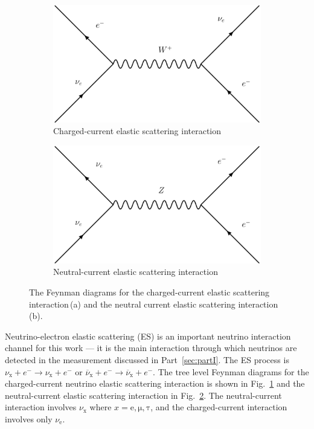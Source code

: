\label{sec:esxsec}
\begin{figure}
\centering
\begin{subfigure}[t]{0.48\textwidth}
\centering
    \includegraphics[width=\textwidth]{cc_es}
    \caption[Charged Current Elastic Scattering Feynman Diagram]{
Charged-current elastic scattering interaction}
\label{fig:ES_CC}
\end{subfigure}
\hfill
\begin{subfigure}[t]{0.48\textwidth}
\centering
    \includegraphics[width=\textwidth]{nc_es}
\caption[Neutral Current Elastic Scattering Feynman Diagram]{
Neutral-current elastic scattering interaction}
\label{fig:ES_NC}
\end{subfigure}
\label{fig:feynman_es}
\caption[Elastic Scattering Feynman Diagrams]{The Feynman diagrams for the
    charged-current elastic scattering interaction\,(a) and the neutral
    current elastic scattering interaction\,(b).}
\end{figure}

Neutrino-electron elastic scattering (ES) is an important neutrino interaction
channel for this work --- it is the main interaction through which neutrinos are
detected in the measurement discussed in Part~\ref{sec:partI}.
The ES process is $\nu_{\mathrm{x}} + e^{-} \rightarrow \nu_{\mathrm{x}} +e^{-}$
or $\overline{\nu}_{\mathrm{x}} + e^{-} \rightarrow \overline{\nu}_{\mathrm{x}} +e^{-}$.
The tree level Feynman diagrams for the charged-current neutrino elastic scattering
interaction is shown in Fig.~\ref{fig:ES_CC} and the neutral-current elastic
scattering interaction in Fig.~\ref{fig:ES_NC}.
The neutral-current interaction involves $\nu_{\mathrm{x}}$ where $x=\mathrm{e, \mu, \tau}$,
and the charged-current interaction involves only $\nu_{\mathrm{e}}$.

